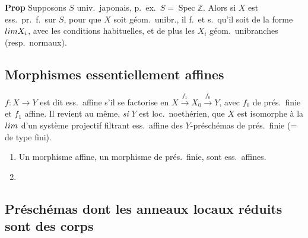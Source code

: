\documentclass[11pt,a4paper]{article}
\begin{document}
\textbf{Prop} Supposons $S$ univ.\ japonais, p.\ ex.\ $S = \operatorname{Spec} \mathbb{Z}$.
Alors si $X$ est  ess.\ pr.\ f.\ sur $S$, pour que $X$
soit géom.\ unibr., il f.\ et s.\ qu'il soit de la forme $\varprojlim X_i$,
avec les conditions habituelles, et de plus les $X_i$ géom.\ unibranches
(resp.\ normaux).

\subsection{Morphismes essentiellement affines}

$f : X \to Y$ est dit ess.\ affine s'il se factorise en
$X \xrightarrow{f_1} X_0 \xrightarrow{f_0} Y$, avec $f_0$ de prés.\ finie
\struck{\ill{}} et $f_1$ affine. Il revient au même, \emph{si} $Y$ est loc.\
noethérien, que $X$ est isomorphe à la $\varprojlim$ d'un système projectif
filtrant \struck{de préschémas} ess.\ affine des $Y$-préschémas de prés.\
finie (= de type fini).
\begin{enumerate}
  \item[(i)] Un morphisme affine, un morphisme de prés.\ finie, sont ess.\
    affines.
  \item[(ii)]
\end{enumerate}

\subsection{Préschémas dont les anneaux locaux réduits sont des corps}
\end{document}
